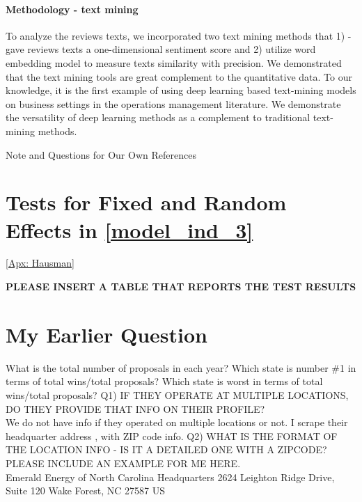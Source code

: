 \documentclass[msom,blindrev]{informs3}
\begin{document}
\paragraph{Methodology - text mining} To analyze the reviews texts, we incorporated two text mining methods that 1) - gave reviews texts a one-dimensional sentiment score and 2) utilize word embedding model to measure texts similarity with precision. We demonstrated that the text mining tools are great complement to the quantitative data. To our knowledge, it is the first example of using deep learning based text-mining models on business settings in the operations management literature. We demonstrate the versatility of deep learning methods as a complement to traditional text-mining methods.
\begin{APPENDIX}{Note and Questions for Our Own References }

\section{Tests for Fixed and Random Effects in \eqref{model_ind_3}}\ref{Apx: Hausman}

\textbf{PLEASE INSERT A TABLE THAT REPORTS THE TEST RESULTS}



\section{My Earlier Question}

What is the total number of proposals in each year?
Which state is number \#1 in terms of total wins/total proposals?
Which state is worst in terms of total wins/total proposals?
Q1) IF THEY OPERATE AT MULTIPLE LOCATIONS, DO THEY PROVIDE
THAT INFO ON THEIR PROFILE? \\
We do not have info if they operated on multiple locations or not. I scrape their headquarter address , with ZIP code info.
Q2) WHAT IS THE FORMAT OF THE LOCATION INFO - IS IT A DETAILED
ONE WITH A ZIPCODE? PLEASE INCLUDE AN EXAMPLE FOR ME HERE. \\
Emerald Energy of North Carolina Headquarters
2624 Leighton Ridge Drive, Suite 120
Wake Forest, NC
27587 US


\end{APPENDIX}
\end{document}
